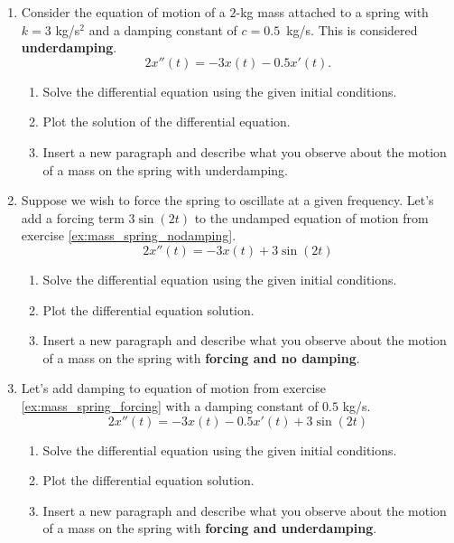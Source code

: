 \begin{enumerate}
\item Consider the equation of motion of a $2$-kg mass attached to a spring with $k=3$ kg/s$^2$ and a damping constant of $c=0.5$~kg/s. This is considered \textbf{underdamping}.
\label{ex:mass_spring_underdamping}
\[ 2 x''(t) = -3 x(t) - 0.5 x'(t). \]
\begin{enumerate}
    \item Solve the differential equation using the given initial conditions.
    \item Plot the solution of the differential equation.
    \item Insert a new paragraph and describe what you observe about the motion of a mass on the spring with underdamping.
\end{enumerate}


\item Suppose we wish to force the spring to oscillate at a given frequency. Let's add a forcing term $3 \sin(2t)$ to the undamped equation of motion from exercise \ref{ex:mass_spring_nodamping}.
\label{ex:mass_spring_forcing}
\[ 2x''(t) = -3 x(t) + 3\sin(2t) \]
\begin{enumerate}
    \item Solve the differential equation using the given initial conditions.
    \item Plot the differential equation solution.
    \item Insert a new paragraph and describe what you observe about the motion of a mass on the spring with \textbf{forcing and no damping}.
\end{enumerate}

\item Let's add damping to equation of motion from exercise \ref{ex:mass_spring_forcing} with a damping constant of $0.5$ kg/s.
\[ 2x''(t) = -3 x(t) - 0.5 x'(t) + 3\sin(2t) \] 
\begin{enumerate}
    \item Solve the differential equation using the given initial conditions.
    \item Plot the differential equation solution.
    \item Insert a new paragraph and describe what you observe about the motion of a mass on the spring with \textbf{forcing and underdamping}.
\end{enumerate}

\end{enumerate}